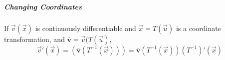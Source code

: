 \documentclass[11pt]{article}
\begin{document}
	\subparagraph{Changing Coordinates} If $\vec{v}(\vec{x})$ is continuously differentiable and $\vec{x} = T(\vec{u})$ is a coordinate transformation, and $\bar{\mathbf{v}} = \vec{v}(T(\vec{u})$,
		\begin{equation}
			\vec{v}'(\vec{x}) = (\bar{\mathbf{v}} (T^{-1}(\vec{x}))) = \bar{\mathbf{v}}(T^{-1}(\vec{x}))(T^{-1})'(\vec{x})
		\end{equation}
%		
%		


\end{document}
